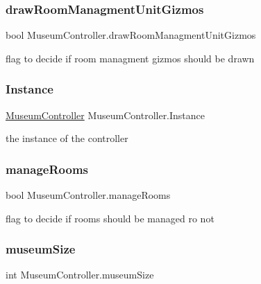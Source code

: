 \subsubsection{\texorpdfstring{draw\+Room\+Managment\+Unit\+Gizmos}{drawRoomManagmentUnitGizmos}}
{\footnotesize\ttfamily bool Museum\+Controller.\+draw\+Room\+Managment\+Unit\+Gizmos\hspace{0.3cm}{\ttfamily [private]}}



flag to decide if room managment gizmos should be drawn 

\mbox{\label{class_museum_controller_ab4bf6462a15c26e2acb9340ec207d9a6}} 
\subsubsection{\texorpdfstring{Instance}{Instance}}
{\footnotesize\ttfamily \mbox{\hyperlink{class_museum_controller}{Museum\+Controller}} Museum\+Controller.\+Instance\hspace{0.3cm}{\ttfamily [static]}}



the instance of the controller 

\mbox{\label{class_museum_controller_a45d6d1ffedb15567ac080d1e47092fdc}} 
\subsubsection{\texorpdfstring{manage\+Rooms}{manageRooms}}
{\footnotesize\ttfamily bool Museum\+Controller.\+manage\+Rooms\hspace{0.3cm}{\ttfamily [private]}}



flag to decide if rooms should be managed ro not 

\mbox{\label{class_museum_controller_afdb90407fa9a9f8712edc815798bf2c0}} 
\subsubsection{\texorpdfstring{museum\+Size}{museumSize}}
{\footnotesize\ttfamily int Museum\+Controller.\+museum\+Size\hspace{0.3cm}{\ttfamily [private]}}



